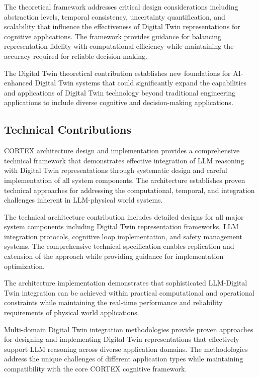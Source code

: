 The theoretical framework addresses critical design considerations including abstraction levels, temporal consistency, uncertainty quantification, and scalability that influence the effectiveness of Digital Twin representations for cognitive applications. The framework provides guidance for balancing representation fidelity with computational efficiency while maintaining the accuracy required for reliable decision-making.

The Digital Twin theoretical contribution establishes new foundations for AI-enhanced Digital Twin systems that could significantly expand the capabilities and applications of Digital Twin technology beyond traditional engineering applications to include diverse cognitive and decision-making applications.

\subsection{Technical Contributions}

CORTEX architecture design and implementation provides a comprehensive technical framework that demonstrates effective integration of LLM reasoning with Digital Twin representations through systematic design and careful implementation of all system components. The architecture establishes proven technical approaches for addressing the computational, temporal, and integration challenges inherent in LLM-physical world systems.

The technical architecture contribution includes detailed designs for all major system components including Digital Twin representation frameworks, LLM integration protocols, cognitive loop implementation, and safety management systems. The comprehensive technical specification enables replication and extension of the approach while providing guidance for implementation optimization.

The architecture implementation demonstrates that sophisticated LLM-Digital Twin integration can be achieved within practical computational and operational constraints while maintaining the real-time performance and reliability requirements of physical world applications.

Multi-domain Digital Twin integration methodologies provide proven approaches for designing and implementing Digital Twin representations that effectively support LLM reasoning across diverse application domains. The methodologies address the unique challenges of different application types while maintaining compatibility with the core CORTEX cognitive framework.

